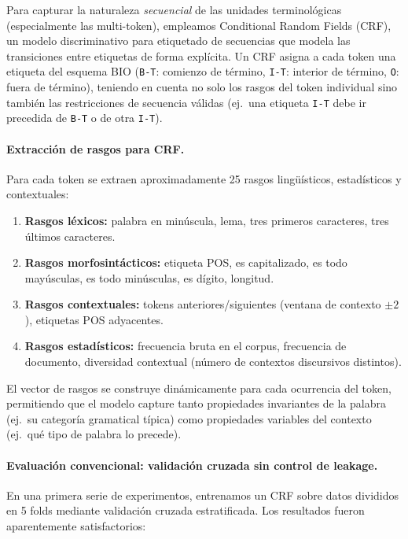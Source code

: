 Para capturar la naturaleza \emph{secuencial} de las unidades terminológicas (especialmente las multi-token), empleamos Conditional Random Fields (CRF), un modelo discriminativo para etiquetado de secuencias que modela las transiciones entre etiquetas de forma explícita. Un CRF asigna a cada token una etiqueta del esquema BIO (\texttt{B-T}: comienzo de término, \texttt{I-T}: interior de término, \texttt{O}: fuera de término), teniendo en cuenta no solo los rasgos del token individual sino también las restricciones de secuencia válidas (ej.\ una etiqueta \texttt{I-T} debe ir precedida de \texttt{B-T} o de otra \texttt{I-T}).

\paragraph{Extracción de rasgos para CRF.}
Para cada token se extraen aproximadamente 25 rasgos lingüísticos, estadísticos y contextuales:

\begin{enumerate}
    \item \textbf{Rasgos léxicos:} palabra en minúscula, lema, tres primeros caracteres, tres últimos caracteres.
    \item \textbf{Rasgos morfosintácticos:} etiqueta POS, es capitalizado, es todo mayúsculas, es todo minúsculas, es dígito, longitud.
    \item \textbf{Rasgos contextuales:} tokens anteriores/siguientes (ventana de contexto $\pm 2$), etiquetas POS adyacentes.
    \item \textbf{Rasgos estadísticos:} frecuencia bruta en el corpus, frecuencia de documento, diversidad contextual (número de contextos discursivos distintos).
\end{enumerate}

El vector de rasgos se construye dinámicamente para cada ocurrencia del token, permitiendo que el modelo capture tanto propiedades invariantes de la palabra (ej.\ su categoría gramatical típica) como propiedades variables del contexto (ej.\ qué tipo de palabra lo precede).

\paragraph{Evaluación convencional: validación cruzada sin control de leakage.}
En una primera serie de experimentos, entrenamos un CRF sobre datos divididos en 5 folds mediante validación cruzada estratificada. Los resultados fueron aparentemente satisfactorios:

